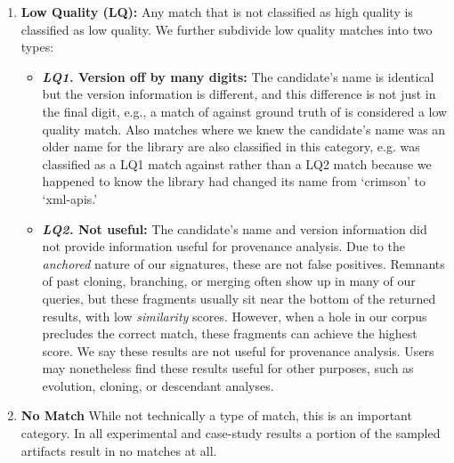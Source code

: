 \begin{enumerate}
\begin{itemize}
    \end{itemize}

    \vspace{0.7em}
    \item \textbf{Low Quality (LQ):}
    Any match that is not classified as high quality is classified as low
    quality.  We further subdivide low quality matches into two types:

    \begin{itemize}

        \vspace{0.7em}
        \item \textbf{\emph{LQ1.} Version off by many digits:}
        The candidate's name is identical but the version information is
        different, and this difference is not just in the final digit, e.g.,  a
        match of  against ground truth of
         is considered a low quality match.  Also
        matches where we knew the candidate's name was an older name for the
        library are also classified in this category, e.g.
         was classified as a LQ1 match
        against  rather than a LQ2 match because we
        happened to know the library had changed its name from `crimson' to
        `xml-apis.'

        \vspace{0.7em}
        \item \textbf{\emph{LQ2.} Not useful:}
        The candidate's name and version information did not provide
        information useful for provenance analysis.  Due to the \emph{anchored}
        nature of our signatures, these are not false positives.  Remnants of
        past cloning, branching, or merging often show up in many of our
        queries, but these fragments usually sit near the bottom of the
        returned results, with low \emph{similarity} scores.  However, when a
        hole in our corpus precludes the correct match, these fragments can
        achieve the highest score.  We say these results are not useful for
        provenance analysis.  Users may nonetheless find these results useful
        for other purposes, such as evolution, cloning, or descendant analyses.




    \end{itemize}

    \vspace{0.7em}
    \item \textbf{No Match}
    While not technically a type of match, this is an important category.
    In all experimental and case-study results a portion of the sampled
    artifacts result in no matches at all.

\end{enumerate}


